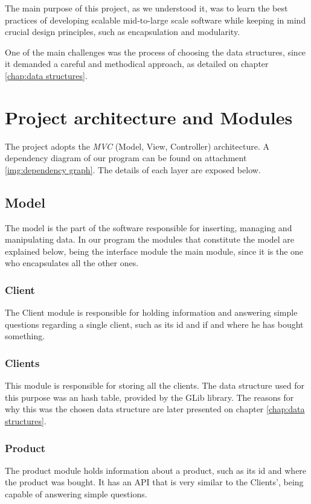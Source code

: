 \documentclass[a4paper]{report}
\begin{document}
The main purpose of this project, as we understood it, was to learn the best practices of developing scalable mid-to-large scale software while keeping in mind crucial design principles, such as encapsulation and modularity.

One of the main challenges was the process of choosing the data structures, since it demanded a careful and methodical approach, as detailed on chapter \ref{chap:data structures}.


\chapter{Project  architecture and Modules}\label{chap:api}
The project adopts the \textit{MVC} (Model, View,
Controller) architecture. 
A dependency diagram of our program can be found on attachment \ref{img:dependency graph}.
The details of each layer are exposed below.
\section{Model} 
The model is the part of the software responsible for inserting, managing and manipulating data.
In our program the modules that constitute the model are explained below, being the interface module the
main module, since it is the one who encapsulates all the other ones.

\subsection{Client}
The Client module is responsible for holding information and answering simple 
questions regarding a single client, such as its id and if and where he has bought something.

\subsection{Clients}

This module is responsible for storing all the clients.
The data structure used for this purpose was an hash table, provided by the GLib library.
The reasons for why this was the chosen data structure are later presented 
on chapter \ref{chap:data structures}.

\subsection{Product}

The product module holds information about a product, such as its id and where the product was bought.
It has an API that is very similar to the Clients', being capable of answering simple questions.
\end{document}
